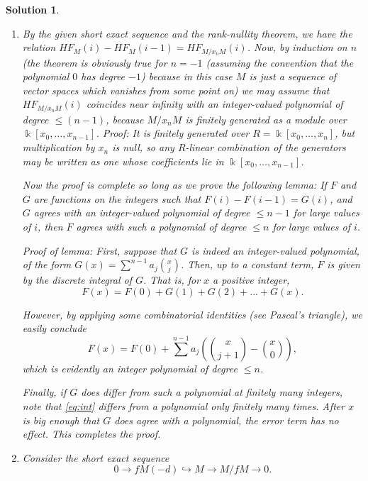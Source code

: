 \documentclass{article}
\theoremstyle{nonumberplain}
\newtheorem{sol}{Solution}
\newcommand{\kk}{\Bbbk}
\begin{document}
\begin{sol}
\begin{enumerate}
\item By the given short exact sequence and the rank-nullity theorem, we have the relation $HF_M(i) - HF_M(i-1) = HF_{M/x_n M}(i)$. Now, by induction on $n$ (the theorem is obviously true for $n = -1$ (assuming the convention that the polynomial $0$ has degree $-1$) because in this case $M$ is just a sequence of vector spaces which vanishes from some point on) we may assume that $HF_{M/x_n M}(i)$ coincides near infinity with an integer-valued polynomial of degree $\leq (n-1)$, because $M/x_n M$ is finitely generated as a module over $\kk[x_0, \dots, x_{n-1}]$. Proof: It is finitely generated over $R = \kk[x_0, \dots, x_n]$, but multiplication by $x_n$ is null, so any $R$-linear combination of the generators may be written as one whose coefficients lie in $\kk[x_0, \dots, x_{n-1}]$.

Now the proof is complete so long as we prove the following lemma: If $F$ and $G$ are functions on the integers such that $F(i) - F(i-1) = G(i)$, and $G$ agrees with an integer-valued polynomial of degree $\leq n-1$ for large values of $i$, then $F$ agrees with such a polynomial of degree $\leq n$ for large values of $i$.

Proof of lemma: First, suppose that $G$ is indeed an integer-valued polynomial, of the form $G(x) = \sum^{n-1} a_j \binom x j$. Then, up to a constant term, $F$ is given by the discrete integral of $G$. That is, for $x$ a positive integer,
\begin{equation}\label{eq:int}
F(x) = F(0) + G(1) + G(2) + \dots + G(x).
\end{equation}

However, by applying some combinatorial identities (see Pascal's triangle), we easily conclude
\begin{equation}
F(x) = F(0) + \sum^{n-1} a_j \left( \binom x {j+1} - \binom x 0 \right),
\end{equation}
which is evidently an integer polynomial of degree $\leq n$.

Finally, if $G$ does differ from such a polynomial at finitely many integers, note that \eqref{eq:int} differs from a polynomial only finitely many times. After $x$ is big enough that $G$ does agree with a polynomial, the error term has no effect. This completes the proof.

\item Consider the short exact sequence
\begin{equation}
0 \to f M(-d) \hookrightarrow M \to M/fM \to 0.
\end{equation}


\end{enumerate}
\end{sol}
\end{document}
